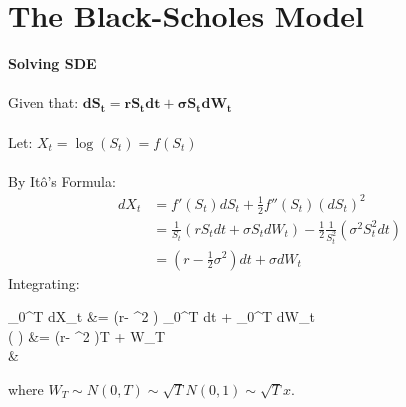 \documentclass{article}
\begin{document}
\section{The Black-Scholes Model}
\begin{minipage}[t]{0.5\textwidth}
	\begin{tcolorbox}[height=11.5cm,boxsep=5pt,arc=0pt,auto outer arc,colback=white,colframe=black]
		\noindent \textbf{Solving SDE}\\ \\
		\noindent Given that: $\boldsymbol{dS_t = r S_t dt + \sigma S_t dW_t}$\\ \\
		\noindent Let: $X_t = \log (S_t) = f(S_t)$\\ \\
		\noindent By Itô's Formula:
		\begin{align*}
		dX_t &= f'(S_t) dS_t + \frac{1}{2} f''(S_t) (dS_t)^2\\
		&= \frac{1}{S_t} (r S_t dt + \sigma S_t dW_t) - \frac{1}{2} \frac{1}{S_t^2} (\sigma^2 S_t^2 dt)\\
		&= \left(r-\frac{1}{2} \sigma^2 \right) dt + \sigma dW_t
		\end{align*}
		\noindent Integrating:
		\begin{flalign*}
		\int_{0}^{T} dX_t &= \left(r- \sigma^2 \right) \int_{0}^{T} dt +  \sigma \int_{0}^{T} dW_t\\
		\log \left(  \right) &= \left(r- \sigma^2 \right)T + \sigma W_T\\
		&
		\end{flalign*}
		\noindent where $W_T \sim N(0,T) \sim \sqrt{T} N(0,1) \sim \sqrt{T} x$.
	\end{tcolorbox}
\end{minipage}
\end{document}

